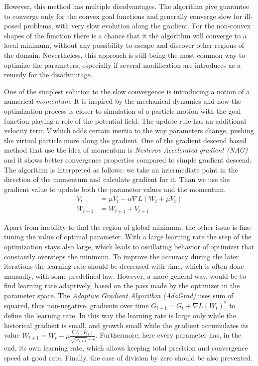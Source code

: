 However, this method has multiple disadvantages.
The algorithm give guarantee to converge only for the convex goal functions and generally converge slow for ill-posed problems, with very slow evolution along the gradient.
For the non-convex shapes of the function there is a chance that it the algorithm will converge to a local minimum, without any possibility to escape and discover other regions of the domain.
Nevertheless, this approach is still being the most common way to optimize the parameters, especially if several modification are introduces as a remedy for the disadvantage.
\medskip

One of the simplest solution to the slow convergence is introducing a notion of a numerical \emph{momentum}.
It is inspired by the mechanical dynamics and now the optimization process is closer to simulation of a particle motion with the goal function playing a role of the potential field.
The update rule has an additional velocity term $V$ which adds certain inertia to the way parameters change, pushing the virtual particle more along the gradient. 
One of the gradient descend based method that use the idea of momentum is \emph{Nesterov Accelerated gradient (NAG)} and it shows better convergence properties compared to simple gradient descend.
The algorithm is interpreted as follows: 
we take an intermediate point in the direction of the momentum and calculate gradient for it.
Than we use the gradient value to update both the parameter values and the momentum.
\begin{align*}
	V_{t} & =\mu V_{t} - \alpha \nabla L (W_{t}+\mu V_{t}) \\
	W_{t+1} & = W_{t+1} + V_{t+1}
\end{align*}

Apart from inability to find the region of global minimum, the other issue is fine-tuning the value of optimal parameter.
With a large learning rate the step of the optimization stays also large, which leads to oscillating behavior of optimizer that constantly oversteps the minimum.
To improve the accuracy during the later iterations the learning rate should be decreased with time, which is often done manually, with some predefined law. 
However, a more general way, would be to find learning rate adaptively, based on the pass made by the optimizer in the parameter space.
The \textit{Adaptive Gradient Algorithm (AdaGrad)} uses sum of squared, thus non-negative, gradients over time $G_{t+1} = G_{t}+\nabla L(W_{t})^2$ to define the learning rate.
In this way the learning rate is large only while the historical gradient is small, and growth small while the gradient accumulates its value $ W_{t+1} = W_{t} -\mu \frac{\nabla L(W_{t})}{\sqrt{G_{t+1}}+\epsilon} $.
Furthermore, here every parameter has, in the end, its own learning rate, which allows keeping total precision and convergence speed at good rate.
Finally, the case of division by zero should be also prevented. 
\medskip


